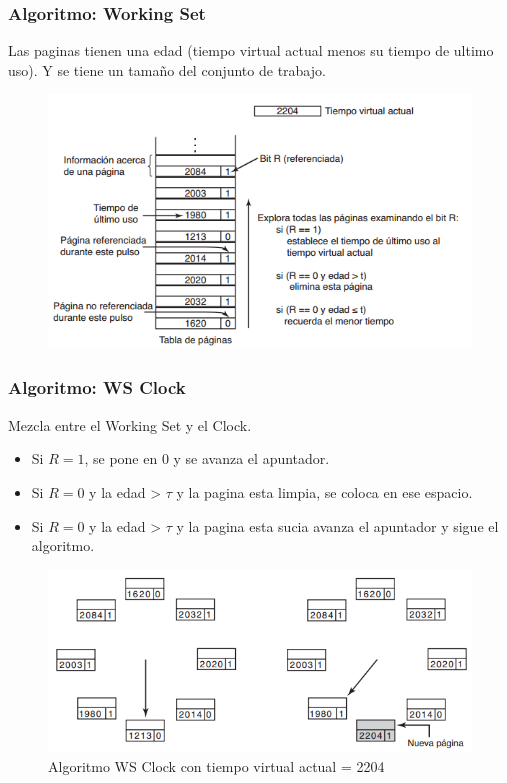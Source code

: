 \documentclass{beamer}
\newcommand{\algTitle}{\textbf{Algoritmo:} }
\begin{document}
\begin{frame}
	\frametitle{\algTitle Working Set}
	\footnotesize
	Las paginas tienen una edad (tiempo virtual actual menos su tiempo de ultimo uso). Y se tiene un tamaño del conjunto de trabajo.

	\begin{figure}[H]
		\centering
		\includegraphics[scale=0.6]{img/workingset.png}
	\end{figure}
\end{frame}


\begin{frame}
	\frametitle{\algTitle WS Clock}
	\footnotesize
	Mezcla entre el Working Set y el Clock.
	\begin{itemize}
		\footnotesize
		\item Si $R = 1$, se pone en 0 y se avanza el apuntador.
		\item Si $R = 0$ y la edad > $\tau$ y la pagina esta limpia, se coloca en ese espacio.
		\item Si $R = 0$ y la edad > $\tau$ y la pagina esta sucia avanza el apuntador y sigue el algoritmo.
	\end{itemize}
	
	\begin{figure}[H]
		\centering
		\includegraphics[scale=0.5]{img/wsclock2.png}
		\caption{Algoritmo WS Clock con tiempo virtual actual = 2204}
	\end{figure}
\end{frame}
\end{document}
